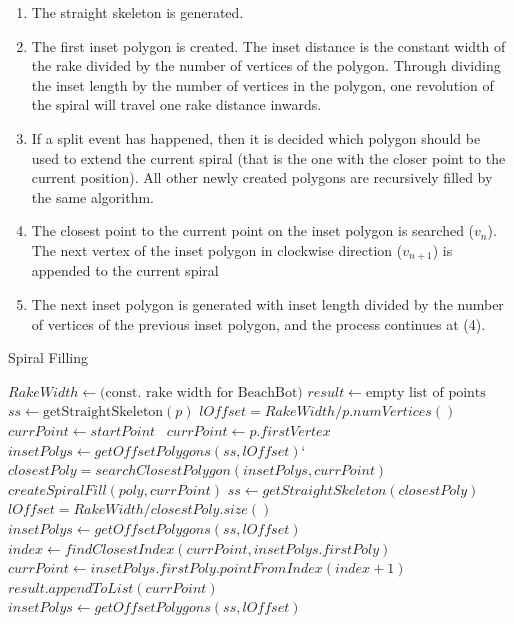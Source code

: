 \begin{enumerate}
\item The straight skeleton is generated.
\item The first inset polygon is created. The inset distance is the constant width of the rake divided by the number of vertices of the polygon. Through dividing the inset length by the number of vertices in the polygon, one revolution of the spiral will travel one rake distance inwards.
\item If a split event has happened, then it is decided which polygon should be used to extend the current spiral (that is the one with the closer point to the current position). All other newly created polygons are recursively filled by the same algorithm. %
\item The closest point to the current point on the inset polygon is searched ($v_n$). The next vertex of the inset polygon in clockwise direction ($v_{n+1}$) is appended to the current spiral
\item The next inset polygon is generated with inset length divided by the number of vertices of the previous inset polygon, and the process continues at (4).

\end{enumerate}

\begin{algorithm}[H]
\begin{algorithmic}
\caption{Spiral Filling}\label{spiral_fill}

\State $RakeWidth \gets \text{(const. rake width for BeachBot)}$
\State $result \gets \text{empty list of points}$
\State $ss \gets \text{getStraightSkeleton}(p)$
\State $lOffset = RakeWidth/p.numVertices()$
 $currPoint \gets startPoint$ 
\Else ~$ currPoint \gets p.firstVertex$ 
\EndIf
\State $insetPolys \gets getOffsetPolygons(ss, lOffset)$`
	\State $closestPoly = searchClosestPolygon(insetPolys, currPoint)$
		\State $createSpiralFill(poly, currPoint)$
	\EndFor
	\State $ss \gets getStraightSkeleton(closestPoly)$
	\State $lOffset = RakeWidth/closestPoly.size()$
	\State $insetPolys \gets getOffsetPolygons(ss, lOffset)$
\EndIf
\State $index \gets findClosestIndex(currPoint, insetPolys.firstPoly)$
\State $currPoint \gets insetPolys.firstPoly.pointFromIndex(index + 1)$
\State $result.appendToList(currPoint)$
\State $insetPolys \gets getOffsetPolygons(ss, lOffset)$
\EndWhile
\EndFunction

\end{algorithmic}

\end{algorithm}

